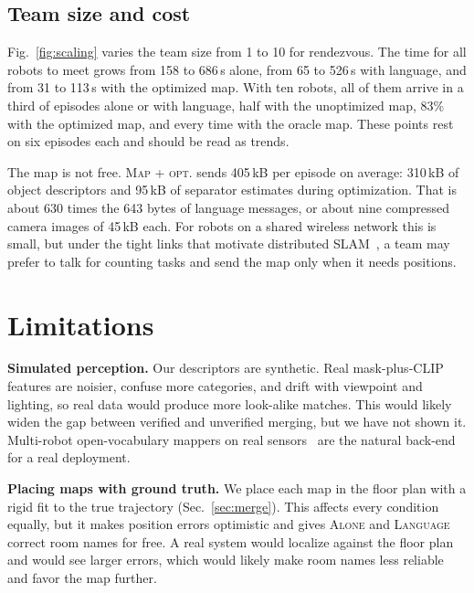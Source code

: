 \documentclass[conference]{IEEEtran}
\newcommand{\cond}[1]{\textsc{#1}}
\begin{document}
\subsection{Team size and cost}\label{sec:cost}
Fig.~\ref{fig:scaling} varies the team size from 1 to 10 for rendezvous.
The time for all robots to meet grows from 158 to 686\,s alone, from 65 to 526\,s with language, and from 31 to 113\,s with the optimized map.
With ten robots, all of them arrive in a third of episodes alone or with language, half with the unoptimized map, 83\% with the optimized map, and every time with the oracle map.
These points rest on six episodes each and should be read as trends.

The map is not free.
\cond{Map + opt.} sends 405\,kB per episode on average: 310\,kB of object descriptors and 95\,kB of separator estimates during optimization.
That is about 630 times the 643 bytes of language messages, or about nine compressed camera images of 45\,kB each.
For robots on a shared wireless network this is small, but under the tight links that motivate distributed SLAM~\cite{choudhary2017ijrr,cieslewski2018icra}, a team may prefer to talk for counting tasks and send the map only when it needs positions.

\section{Limitations}\label{sec:limits}

\textbf{Simulated perception.}
Our descriptors are synthetic.
Real mask-plus-CLIP features are noisier, confuse more categories, and drift with viewpoint and lighting, so real data would produce more look-alike matches.
This would likely widen the gap between verified and unverified merging, but we have not shown it.
Multi-robot open-vocabulary mappers on real sensors~\cite{chang2023hydramulti,gu2025mrcographs,tian2022kimeramulti} are the natural back-end for a real deployment.

\textbf{Placing maps with ground truth.}
We place each map in the floor plan with a rigid fit to the true trajectory (Sec.~\ref{sec:merge}).
This affects every condition equally, but it makes position errors optimistic and gives \cond{Alone} and \cond{Language} correct room names for free.
A real system would localize against the floor plan and would see larger errors, which would likely make room names less reliable and favor the map further.
\end{document}
